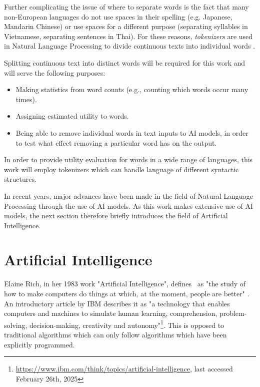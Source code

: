 Further complicating the issue of where to separate words is the fact that many non-European languages do not use spaces in their spelling (e.g. Japanese, Mandarin Chinese) or use spaces for a different purpose (separating syllables in Vietnamese, separating sentences in Thai).
For these reasons, \textit{tokenizers} are used in Natural Language Processing to divide continuous texts into individual words \cite{jurafskySpeechLanguageProcessing2025}.

Splitting continuous text into distinct words will be required for this work and will serve the following purposes:
\begin{itemize}
	\item Making statistics from word counts (e.g., counting which words occur many times).
	\item Assigning estimated utility to words.
	\item Being able to remove individual words in text inputs to AI models, in order to test what effect removing a particular word has on the output.
\end{itemize}

In order to provide utility evaluation for words in a wide range of languages, this work will employ tokenizers which can handle language of different syntactic structures.

In recent years, major advances have been made in the field of Natural Language Processing through the use of AI models.
As this work makes extensive use of AI models, the next section therefore briefly introduces the field of Artificial Intelligence.

\section{Artificial Intelligence}
Elaine Rich, in her 1983 work "Artificial Intelligence", defines \AI\ as "the study of how to make computers do things at which, at the moment, people are better" \cite{rich1983artificial}.
An introductory article by IBM describes it as "a technology that enables computers and machines to simulate human learning, comprehension, problem-solving, decision-making, creativity and autonomy"\footnote{\url{https://www.ibm.com/think/topics/artificial-intelligence}, last accessed February 26th, 2025}.
This is opposed to traditional algorithms which can only follow algorithms which have been explicitly programmed.

